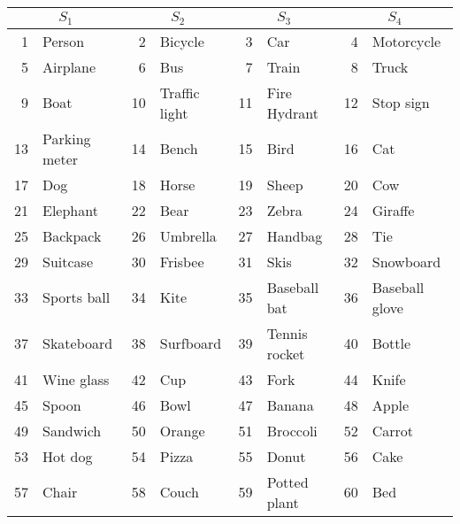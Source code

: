 \documentclass{article}
\begin{document}
\begin{table}[h]
\begin{tabular}{rl|rl|rl|rl}
\multicolumn{2}{c|}{$S_1$} & \multicolumn{2}{c|}{$S_2$} & \multicolumn{2}{c|}{$S_3$} & \multicolumn{2}{c}{$S_4$} \\ \hline
1       & Person            & 2      & Bicycle           & 3      & Car               & 4      & Motorcycle        \\
5       & Airplane          & 6      & Bus               & 7      & Train             & 8      & Truck             \\
9       & Boat              & 10     & Traffic light     & 11     & Fire Hydrant      & 12     & Stop sign         \\
13      & Parking meter     & 14     & Bench             & 15     & Bird              & 16     & Cat               \\
17      & Dog               & 18     & Horse             & 19     & Sheep             & 20     & Cow               \\
21      & Elephant          & 22     & Bear              & 23     & Zebra             & 24     & Giraffe           \\
25      & Backpack          & 26     & Umbrella          & 27     & Handbag           & 28     & Tie               \\
29      & Suitcase          & 30     & Frisbee           & 31     & Skis              & 32     & Snowboard         \\
33      & Sports ball       & 34     & Kite              & 35     & Baseball bat      & 36     & Baseball glove    \\
37      & Skateboard        & 38     & Surfboard         & 39     & Tennis rocket     & 40     & Bottle            \\
41      & Wine glass        & 42     & Cup               & 43     & Fork              & 44     & Knife             \\
45      & Spoon             & 46     & Bowl              & 47     & Banana            & 48     & Apple             \\
49      & Sandwich          & 50     & Orange            & 51     & Broccoli          & 52     & Carrot            \\
53      & Hot dog           & 54     & Pizza             & 55     & Donut             & 56     & Cake              \\
57      & Chair             & 58     & Couch             & 59     & Potted plant      & 60     & Bed               \\

\end{tabular}
\end{table}
\end{document}
